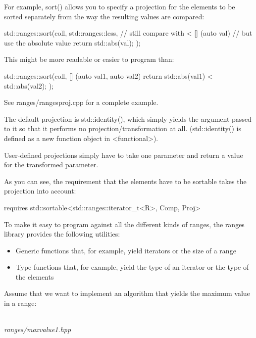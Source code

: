 For example, sort() allows you to specify a projection for the elements to be sorted separately from the way the resulting values are compared:

\begin{cpp}
std::ranges::sort(coll,
				std::ranges::less{}, // still compare with <
				[] (auto val) { // but use the absolute value
					return std::abs(val);
				});
\end{cpp}

This might be more readable or easier to program than:

\begin{cpp}
std::ranges::sort(coll,
				[] (auto val1, auto val2) {
					return std::abs(val1) < std::abs(val2);
				});
\end{cpp}

See ranges/rangesproj.cpp for a complete example.

The default projection is std::identity(), which simply yields the argument passed to it so that it performs no projection/transformation at all. (std::identity() is defined as a new function object in <functional>).

User-defined projections simply have to take one parameter and return a value for the transformed parameter.

As you can see, the requirement that the elements have to be sortable takes the projection into account:

\begin{cpp}
requires std::sortable<std::ranges::iterator_t<R>, Comp, Proj>
\end{cpp}


To make it easy to program against all the different kinds of ranges, the ranges library provides the following utilities:

\begin{itemize}
\item
Generic functions that, for example, yield iterators or the size of a range

\item
Type functions that, for example, yield the type of an iterator or the type of the elements
\end{itemize}

Assume that we want to implement an algorithm that yields the maximum value in a range:

\noindent
\hspace*{\fill} \\ %
\textit{ranges/maxvalue1.hpp}


